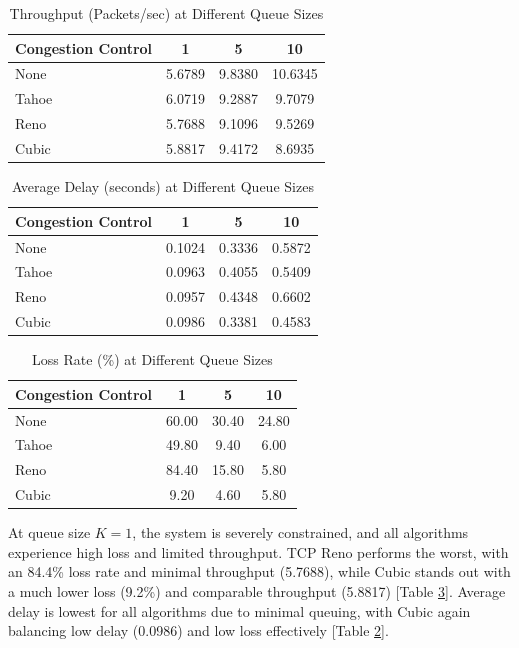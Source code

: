 \documentclass[conference]{IEEEtran}
\begin{document}
\begin{table}[h!]
    \centering
    \caption{Throughput (Packets/sec) at Different Queue Sizes}
    \begin{tabular}{lccc}
    \toprule
    \textbf{Congestion Control} & \textbf{1} & \textbf{5} & \textbf{10} \\
    \midrule
    None  & 5.6789 & 9.8380 & 10.6345 \\
    Tahoe & 6.0719 & 9.2887 & 9.7079  \\
    Reno  & 5.7688 & 9.1096 & 9.5269  \\
    Cubic & 5.8817 & 9.4172 & 8.6935  \\
    \bottomrule
    \end{tabular}
    \label{tab:queue_throughput}
\end{table}

\begin{table}[h!]
    \centering
    \caption{Average Delay (seconds) at Different Queue Sizes}
    \begin{tabular}{lccc}
    \toprule
    \textbf{Congestion Control} & \textbf{1} & \textbf{5} & \textbf{10} \\
    \midrule
    None  & 0.1024 & 0.3336 & 0.5872 \\
    Tahoe & 0.0963 & 0.4055 & 0.5409 \\
    Reno  & 0.0957 & 0.4348 & 0.6602 \\
    Cubic & 0.0986 & 0.3381 & 0.4583 \\
    \bottomrule
    \end{tabular}
    \label{tab:queue_avg_delay}
\end{table}

\begin{table}[h!]
    \centering
    \caption{Loss Rate (\%) at Different Queue Sizes}
    \begin{tabular}{lccc}
    \toprule
    \textbf{Congestion Control} & \textbf{1} & \textbf{5} & \textbf{10} \\
    \midrule
    None  & 60.00 & 30.40 & 24.80 \\
    Tahoe & 49.80 & 9.40  & 6.00  \\
    Reno  & 84.40 & 15.80 & 5.80  \\
    Cubic & 9.20  & 4.60  & 5.80  \\
    \bottomrule
    \end{tabular}
    \label{tab:queue_loss_rate}
\end{table}

At queue size $K=1$, the system is severely constrained, and all algorithms experience high loss and limited throughput. 
TCP Reno performs the worst, with an 84.4\% loss rate and minimal throughput (5.7688), while Cubic stands out with a much lower loss (9.2\%) and comparable throughput (5.8817) [Table \ref{tab:queue_loss_rate}]. 
Average delay is lowest for all algorithms due to minimal queuing, with Cubic again balancing low delay (0.0986) and low loss effectively [Table \ref{tab:queue_avg_delay}].
\end{document}
